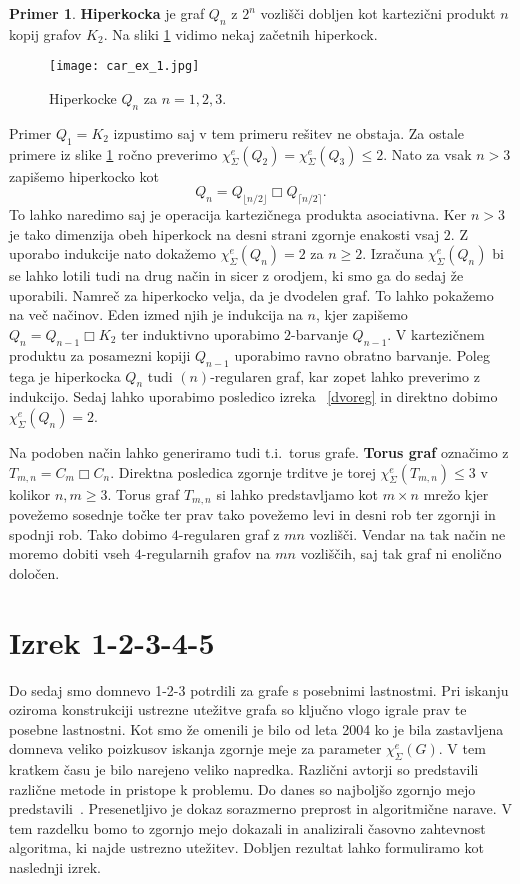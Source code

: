 \documentclass[12pt,a4paper,twoside]{article}
\theoremstyle{definition} %
\newtheorem{primer}[definicija]{Primer}
\theoremstyle{plain} %
\newcommand{\ec}{\chi_{\Sigma}^e}
\numberwithin{equation}{section}  %
\DeclareMathOperator{\cart}{\Box}
\begin{document}
\begin{primer}
\textbf{Hiperkocka} je graf $Q_n$ z $2^n$ vozlišči dobljen kot kartezični produkt $n$ kopij grafov $K_2$. Na sliki \ref{hip} vidimo nekaj začetnih hiperkock.
 \begin{figure}[h!]
\caption{Hiperkocke $Q_n$ za $n=1,2,3$.}
\label{hip}
\centering
    \texttt{[image: car\_ex\_1.jpg]}
    \end{figure}
Primer $Q_1 = K_2$ izpustimo saj v tem primeru rešitev ne obstaja. Za ostale primere iz slike \ref{hip}  ročno preverimo $\ec(Q_2) = \ec(Q_3) \le 2.$ Nato za vsak $n > 3$ zapišemo hiperkocko kot
 $$Q_n = Q_{\lfloor n/2 \rfloor}  \cart Q_{\lceil n/2 \rceil}.$$
 To lahko naredimo saj je operacija kartezičnega produkta asociativna. Ker $n > 3$ je tako dimenzija obeh hiperkock na desni strani zgornje enakosti vsaj $2$. Z uporabo indukcije nato dokažemo $\ec(Q_n) = 2$ za $ n \ge 2$. Izračuna $\ec(Q_n)$ bi se lahko lotili tudi na drug način in sicer z orodjem, ki smo ga do sedaj že uporabili. Namreč za hiperkocko velja, da je dvodelen graf. To lahko pokažemo na več načinov.  Eden izmed njih je indukcija na $n$, kjer zapišemo $Q_n = Q_{n-1}  \cart K_2$ ter induktivno uporabimo $2$-barvanje $Q_{n-1}$. V kartezičnem produktu za posamezni kopiji $Q_{n-1}$ uporabimo ravno obratno barvanje. Poleg tega je hiperkocka $Q_n$ tudi $(n)$-regularen graf, kar zopet lahko preverimo z indukcijo. Sedaj lahko uporabimo posledico izreka ~\ref{dvoreg} in direktno dobimo $\ec(Q_n) = 2$.

Na podoben način lahko generiramo tudi t.i.\ torus grafe. \textbf{Torus graf} označimo z $T_{m,n} = C_m  \cart C_n$. Direktna posledica zgornje trditve je torej $\ec(T_{m,n}) \le 3$ v kolikor $n,m \ge 3$. Torus graf $T_{m,n}$ si lahko predstavljamo kot $m \times n$ mrežo kjer povežemo sosednje točke ter prav tako povežemo levi in desni rob ter zgornji in spodnji rob. Tako dobimo $4$-regularen graf z $mn$ vozlišči. Vendar na tak način ne moremo dobiti vseh $4$-regularnih grafov na $mn$ vozliščih, saj tak graf ni enolično določen.
\end{primer}




 
 \section{Izrek 1-2-3-4-5}
Do sedaj smo domnevo 1-2-3 potrdili za grafe s posebnimi lastnostmi. Pri iskanju oziroma konstrukciji ustrezne utežitve grafa so ključno vlogo igrale prav te posebne lastnostni.  Kot smo že omenili je bilo od leta 2004 ko je bila zastavljena domneva veliko poizkusov iskanja zgornje meje za parameter $\ec(G)$. V tem kratkem času je bilo narejeno veliko napredka. Različni avtorji so predstavili različne metode in pristope k problemu. Do danes so najboljšo zgornjo mejo predstavili~\citet{proof12345}. Presenetljivo je dokaz sorazmerno preprost in algoritmične narave. V tem razdelku bomo to zgornjo mejo dokazali in analizirali časovno zahtevnost algoritma, ki najde ustrezno utežitev. Dobljen rezultat lahko formuliramo kot naslednji izrek.
\end{document}
